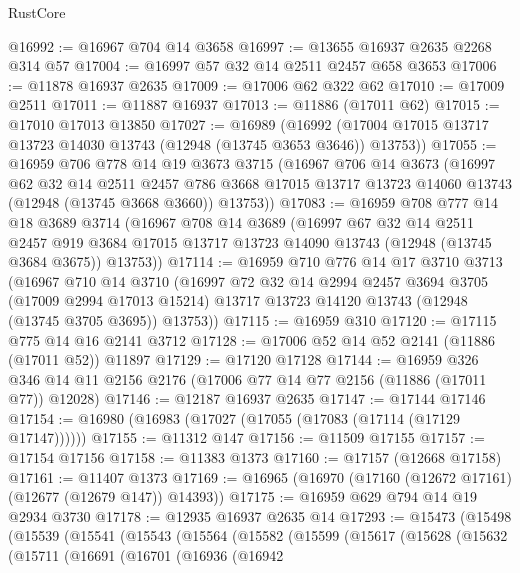 \begin{lexlean}{RustCore}
\begin{coremodule}
@16992 := @16967 @704 @14 @3658
@16997 := @13655 @16937 @2635 @2268 @314 @57
@17004 := @16997 @57 @32 @14 @2511 @2457 @658 @3653
@17006 := @11878 @16937 @2635
@17009 := @17006 @62 @322 @62
@17010 := @17009 @2511
@17011 := @11887 @16937
@17013 := @11886 (@17011 @62)
@17015 := @17010 @17013 @13850
@17027 := @16989
    (@16992 (@17004 @17015 @13717 @13723 @14030 @13743 (@12948 (@13745 @3653 @3646)) @13753))
@17055 := @16959
    @706
    @778
    @14
    @19
    @3673
    @3715
    (@16967
      @706
      @14
      @3673
      (@16997
        @62
        @32
        @14
        @2511
        @2457
        @786
        @3668
        @17015
        @13717
        @13723
        @14060
        @13743
        (@12948 (@13745 @3668 @3660))
        @13753))
@17083 := @16959
    @708
    @777
    @14
    @18
    @3689
    @3714
    (@16967
      @708
      @14
      @3689
      (@16997
        @67
        @32
        @14
        @2511
        @2457
        @919
        @3684
        @17015
        @13717
        @13723
        @14090
        @13743
        (@12948 (@13745 @3684 @3675))
        @13753))
@17114 := @16959
    @710
    @776
    @14
    @17
    @3710
    @3713
    (@16967
      @710
      @14
      @3710
      (@16997
        @72
        @32
        @14
        @2994
        @2457
        @3694
        @3705
        (@17009 @2994 @17013 @15214)
        @13717
        @13723
        @14120
        @13743
        (@12948 (@13745 @3705 @3695))
        @13753))
@17115 := @16959 @310
@17120 := @17115 @775 @14 @16 @2141 @3712
@17128 := @17006 @52 @14 @52 @2141 (@11886 (@17011 @52)) @11897
@17129 := @17120 @17128
@17144 := @16959
    @326
    @346
    @14
    @11
    @2156
    @2176
    (@17006 @77 @14 @77 @2156 (@11886 (@17011 @77)) @12028)
@17146 := @12187 @16937 @2635
@17147 := @17144 @17146
@17154 := @16980 (@16983 (@17027 (@17055 (@17083 (@17114 (@17129 @17147))))))
@17155 := @11312 @147
@17156 := @11509 @17155
@17157 := @17154 @17156
@17158 := @11383 @1373
@17160 := @17157 (@12668 @17158)
@17161 := @11407 @1373
@17169 := @16965 (@16970 (@17160 (@12672 @17161) (@12677 (@12679 @147)) @14393))
@17175 := @16959 @629 @794 @14 @19 @2934 @3730
@17178 := @12935 @16937 @2635 @14
@17293 := @15473
    (@15498
      (@15539
        (@15541
          (@15543
            (@15564
              (@15582
                (@15599
                  (@15617
                    (@15628
                      (@15632
                        (@15711
                          (@16691
                            (@16701
                              (@16936
                                (@16942

\end{coremodule}
\end{lexlean}
